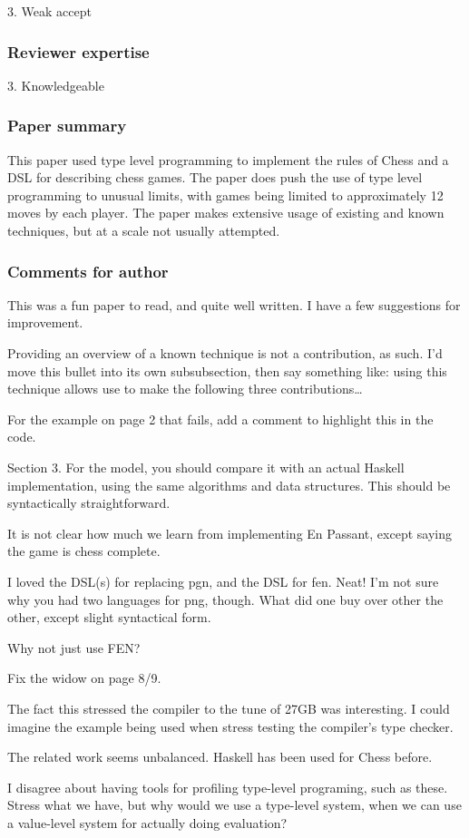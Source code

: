 3. Weak accept

\subsubsection{Reviewer expertise}

3. Knowledgeable

\subsubsection{Paper summary}

This paper used type level programming to implement the rules of Chess and a DSL for describing chess games. The paper does push the use of type level programming to unusual limits, with games being limited to approximately 12 moves by each player. The paper makes extensive usage of existing and known techniques, but at a scale not usually attempted.

\subsubsection{Comments for author}

This was a fun paper to read, and quite well written. I have a few suggestions for improvement.

Providing an overview of a known technique is not a contribution, as such. I'd move this bullet into its own subsubsection, then say something like: using this technique allows use to make the following three contributions…

For the example on page 2 that fails, add a comment to highlight this in the code.

Section 3. For the model, you should compare it with an actual Haskell implementation, using the same algorithms and data structures. This should be syntactically straightforward.

It is not clear how much we learn from implementing En Passant, except saying the game is chess complete.

I loved the DSL(s) for replacing pgn, and the DSL for fen. Neat! I'm not sure why you had two languages for png, though. What did one buy over other the other, except slight syntactical form.

Why not just use FEN?

Fix the widow on page 8/9.

The fact this stressed the compiler to the tune of 27GB was interesting. I could imagine the example being used when stress testing the compiler's type checker.

The related work seems unbalanced. Haskell has been used for Chess before.

I disagree about having tools for profiling type-level programing, such as these. Stress what we have, but why would we use a type-level system, when we can use a value-level system for actually doing evaluation?

